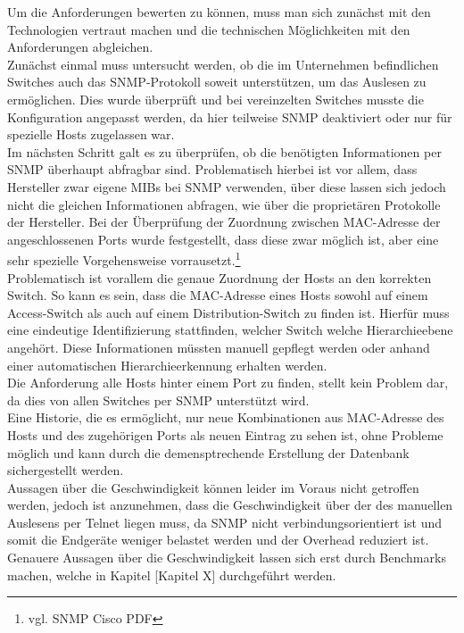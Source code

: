 Um die Anforderungen bewerten zu können, muss man sich zunächst mit den Technologien vertraut machen und die technischen Möglichkeiten mit den Anforderungen abgleichen.\\
Zunächst einmal muss untersucht werden, ob die im Unternehmen befindlichen Switches auch das SNMP-Protokoll soweit unterstützen, um das Auslesen zu ermöglichen.
Dies wurde überprüft und bei vereinzelten Switches musste die Konfiguration angepasst werden, da hier teilweise SNMP deaktiviert oder nur für spezielle Hosts zugelassen war.\\
Im nächsten Schritt galt es zu überprüfen, ob die benötigten Informationen per SNMP überhaupt abfragbar sind. Problematisch hierbei ist vor allem, dass Hersteller zwar eigene MIBs bei SNMP verwenden, über diese lassen sich jedoch nicht die gleichen Informationen abfragen, wie über die proprietären Protokolle der Hersteller.
Bei der Überprüfung der Zuordnung zwischen MAC-Adresse der angeschlossenen Ports wurde festgestellt, dass diese zwar möglich ist, aber eine sehr spezielle Vorgehensweise vorrausetzt.\footnote{vgl. SNMP Cisco PDF}\\
Problematisch ist vorallem die genaue Zuordnung der Hosts an den korrekten Switch. So kann es sein, dass die MAC-Adresse eines Hosts sowohl auf einem Access-Switch als auch auf einem Distribution-Switch zu finden ist.
Hierfür muss eine eindeutige Identifizierung stattfinden, welcher Switch welche Hierarchieebene angehört. Diese Informationen müssten manuell gepflegt werden oder anhand einer automatischen Hierarchieerkennung erhalten werden.\\
Die Anforderung alle Hosts hinter einem Port zu finden, stellt kein Problem dar, da dies von allen Switches per SNMP unterstützt wird. \\
Eine Historie, die es ermöglicht, nur neue Kombinationen aus MAC-Adresse des Hosts und des zugehörigen Ports als neuen Eintrag zu sehen ist, ohne Probleme möglich und kann durch die demensptrechende Erstellung der Datenbank sichergestellt werden.\\
Aussagen über die Geschwindigkeit können leider im Voraus nicht getroffen werden, jedoch ist anzunehmen, dass die Geschwindigkeit über der des manuellen Auslesens per Telnet liegen muss, da SNMP nicht verbindungsorientiert ist und somit die Endgeräte weniger belastet werden und der Overhead reduziert ist. Genauere Aussagen über die Geschwindigkeit lassen sich erst durch Benchmarks machen, welche in Kapitel [Kapitel X] durchgeführt werden.\\

